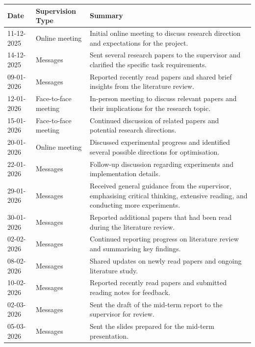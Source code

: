 \begin{table}[h]
\centering
\renewcommand{\arraystretch}{1.2}
\small
\begin{tabular}{|p{2.2cm}|p{3cm}|p{9.3cm}|}
\hline
\textbf{Date} & \textbf{Supervision Type} & \textbf{Summary} \\
\hline
11-12-2025 & Online meeting & Initial online meeting to discuss research direction and expectations for the project. \\
\hline
14-12-2025 & Messages & Sent several research papers to the supervisor and clarified the specific task requirements. \\
\hline
09-01-2026 & Messages & Reported recently read papers and shared brief insights from the literature review. \\
\hline
12-01-2026 & Face-to-face meeting & In-person meeting to discuss relevant papers and their implications for the research topic. \\
\hline
15-01-2026 & Face-to-face meeting & Continued discussion of related papers and potential research directions. \\
\hline
20-01-2026 & Online meeting & Discussed experimental progress and identified several possible directions for optimisation. \\
\hline
22-01-2026 & Messages & Follow-up discussion regarding experiments and implementation details. \\
\hline
29-01-2026 & Messages & Received general guidance from the supervisor, emphasising critical thinking, extensive reading, and conducting more experiments. \\
\hline
30-01-2026 & Messages & Reported additional papers that had been read during the literature review. \\
\hline
02-02-2026 & Messages & Continued reporting progress on literature review and summarising key findings. \\
\hline
08-02-2026 & Messages & Shared updates on newly read papers and ongoing literature study. \\
\hline
10-02-2026 & Messages & Reported recently read papers and submitted reading notes for feedback. \\
\hline
02-03-2026 & Messages & Sent the draft of the mid-term report to the supervisor for review. \\
\hline
05-03-2026 & Messages & Sent the slides prepared for the mid-term presentation. \\
\hline
\end{tabular}
\end{table}

